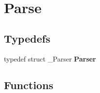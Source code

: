 \hypertarget{group__parse}{}\section{Parse}
\label{group__parse}
\subsection*{Typedefs}
\begin{DoxyCompactItemize}
\item 
\mbox{\label{group__parse_ga3e16ad91ee0aeae3293a3908c21e501b}} 
typedef struct \+\_\+\+Parser {\bfseries Parser}
\end{DoxyCompactItemize}
\subsection*{Functions}
